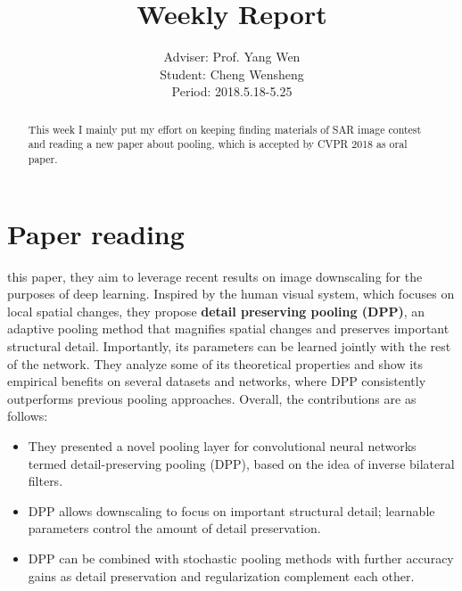 \documentclass[]{IEEEtran}
\begin{document}
	\title{Weekly Report}
	\author{Adviser: Prof. Yang Wen \\Student: Cheng Wensheng\\ Period: 2018.5.18-5.25
	}
	\maketitle

\begin{abstract}
	This week I mainly put my effort on keeping finding materials of SAR image contest and reading a new paper about pooling, which is accepted by CVPR 2018 as oral paper. 
\end{abstract}

\section{Paper reading}
	 this paper, they aim to leverage recent results on image downscaling for the purposes of deep learning. Inspired by the human visual system, which focuses on local spatial changes, they propose \textbf{detail preserving pooling (DPP)}, an adaptive pooling method that magnifies spatial changes and preserves important structural detail. Importantly, its parameters can be learned jointly with the rest of the network. They analyze some of its theoretical properties and show its empirical benefits on several datasets and networks, where DPP consistently outperforms previous pooling approaches. Overall, the contributions are as follows:
	\begin{itemize}
		\item They presented a novel pooling layer for convolutional neural networks termed detail-preserving pooling (DPP), based on the idea of inverse bilateral filters.
		\item DPP allows downscaling to focus on important structural detail; learnable parameters control the amount of detail preservation.
		\item DPP can be combined with stochastic pooling methods
		with further accuracy gains as detail preservation and
		regularization complement each other.
	\end{itemize}
\end{document}
